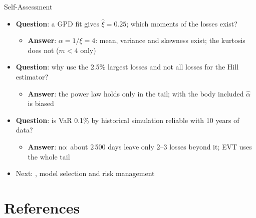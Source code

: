 \begin{frame}{Self-Assessment}
\itemsize{\small}
\begin{itemize}
    \item \textbf{Question}: a GPD fit gives $\hat\xi = 0.25$; which moments of the losses exist?
    \begin{itemize}
        \item \textbf{Answer}: $\alpha = 1/\xi = 4$: mean, variance and skewness exist; the kurtosis does not ($m < 4$ only)
    \end{itemize}
    \item \textbf{Question}: why use the 2.5\% largest losses and not all losses for the Hill estimator?
    \begin{itemize}
        \item \textbf{Answer}: the power law holds only in the tail; with the body included $\hat\alpha$ is biased
    \end{itemize}
    \item \textbf{Question}: is VaR 0.1\% by historical simulation reliable with 10 years of data?
    \begin{itemize}
        \item \textbf{Answer}: no: about 2\,500 days leave only 2--3 losses beyond it; EVT uses the whole tail
    \end{itemize}
    \item Next: , model selection and risk management
\end{itemize}
\end{frame}


\section{References}

